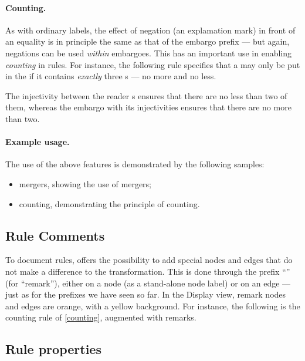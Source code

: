 
\paragraph{Counting.}

As with ordinary labels, the effect of negation (an explamation mark) in front
of an equality is in principle the same as
that of the embargo prefix --- but again, negations can be used \emph{within}
embargoes. This has an important use in enabling \emph{counting} in rules. For
instance, the following rule specifies that a  may only be put in
the  if it contains \emph{exactly} three s --- no
more and no less. 

%
The injectivity between the reader s ensures that there are no less
than two of them, whereas the embargo  with its injectivities
ensures that there are no more than two.

\paragraph{Example usage.}

The use of the above features is demonstrated by the following \GROOVE samples:
%
\begin{itemize}\noitemsep
\item \textsf{mergers}, showing the use of mergers;
\item \textsf{counting}, demonstrating the principle of counting.
\end{itemize}

\subsection{Rule Comments}

To document rules, \GROOVE{} offers the possibility to add special nodes and
edges that do not make a difference to the transformation. This is done through
the prefix ``\remP'' (for ``remark''), either on a node (as a stand-alone node
label) or on an edge --- just as for the prefixes we have seen so far. In the
Display view, remark nodes and edges are orange, with a yellow background. For
instance, the following is the counting rule of \eqref{counting}, augmented
with remarks.


\subsection{Rule properties}


